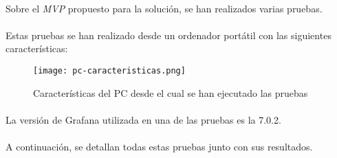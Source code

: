 \documentclass[../../memoria.tex]{subfiles}
\begin{document}
\paragraph{}
Sobre el \textit{MVP} propuesto para la solución, se han realizados varias pruebas.
\paragraph{}
Estas pruebas se han realizado desde un ordenador portátil con las siguientes características:

\begin{figure}[H]
    \centering
    \texttt{[image: pc-caracteristicas.png]}
    \caption{Características del PC desde el cual se han ejecutado las pruebas}
    \label{fig:pcCaracteristicas}
\end{figure}

\paragraph{}
La versión de Grafana \cite{grafana} utilizada en una de las pruebas es la 7.0.2.
\paragraph{}
A continuación, se detallan todas estas pruebas junto con sus resultados.
\end{document}
